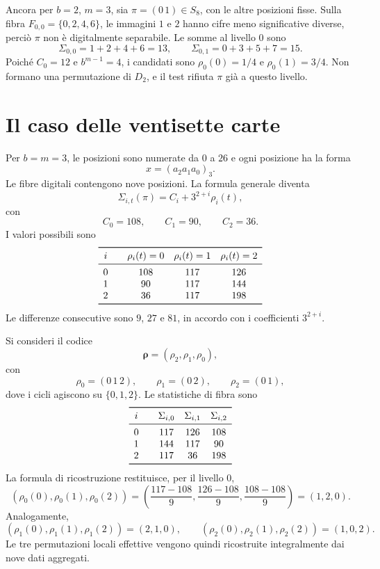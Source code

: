 	\begin{example}
		Ancora per \(b=2\), \(m=3\), sia \(\pi=(0\,1)\in S_8\), con
		le altre posizioni fisse. Sulla fibra \(F_{0,0}=\{0,2,4,6\}\), le
		immagini \(1\) e \(2\) hanno cifre meno significative diverse, perciò
		\(\pi\) non è digitalmente separabile. Le somme al livello \(0\) sono
		\[
		\Sigma_{0,0}=1+2+4+6=13,\qquad
		\Sigma_{0,1}=0+3+5+7=15.
		\]
		Poiché \(C_0=12\) e \(b^{m-1}=4\), i candidati sono
		\(\rho_0(0)=1/4\) e \(\rho_0(1)=3/4\). Non formano una
		permutazione di \(D_2\), e il test rifiuta \(\pi\) già a questo livello.
	\end{example}

	\section{Il caso delle ventisette carte}

	Per \(b=m=3\), le posizioni sono numerate da \(0\) a \(26\) e ogni posizione
	ha la forma
	\[
	x=(a_2a_1a_0)_3.
	\]
	Le fibre digitali contengono nove posizioni. La formula generale diventa
	\[
	\Sigma_{i,t}(\pi)
	=
	C_i+3^{2+i}\rho_i(t),
	\]
	con
	\[
	C_0=108,
	\qquad
	C_1=90,
	\qquad
	C_2=36.
	\]
	I valori possibili sono
	\[
	\begin{array}{c@{\qquad}ccc}
		\toprule
		i & \rho_i(t)=0 & \rho_i(t)=1 & \rho_i(t)=2\\
		\midrule
		0 & 108 & 117 & 126\\
		1 &  90 & 117 & 144\\
		2 &  36 & 117 & 198\\
		\bottomrule
	\end{array}
	\]
	Le differenze consecutive sono \(9\), \(27\) e \(81\), in accordo con i
	coefficienti \(3^{2+i}\).

	\begin{example}
		Si consideri il codice
		\[
		\boldsymbol{\rho}
		=
		(\rho_2,\rho_1,\rho_0),
		\]
		con
		\[
		\rho_0=(0\,1\,2),
		\qquad
		\rho_1=(0\,2),
		\qquad
		\rho_2=(0\,1),
		\]
		dove i cicli agiscono su \(\{0,1,2\}\). Le statistiche di fibra sono
		\[
		\begin{array}{c@{\qquad}ccc}
			\toprule
			i & \Sigma_{i,0} & \Sigma_{i,1} & \Sigma_{i,2}\\
			\midrule
			0 & 117 & 126 & 108\\
			1 & 144 & 117 &  90\\
			2 & 117 &  36 & 198\\
			\bottomrule
		\end{array}
		\]
		La formula di ricostruzione restituisce, per il livello \(0\),
		\[
		(\rho_0(0),\rho_0(1),\rho_0(2))
		=
		\left(
		\frac{117-108}{9},
		\frac{126-108}{9},
		\frac{108-108}{9}
		\right)
		=
		(1,2,0).
		\]
		Analogamente,
		\[
		(\rho_1(0),\rho_1(1),\rho_1(2))=(2,1,0),
		\qquad
		(\rho_2(0),\rho_2(1),\rho_2(2))=(1,0,2).
		\]
		Le tre permutazioni locali effettive vengono quindi ricostruite
		integralmente dai nove dati aggregati.
	\end{example}

